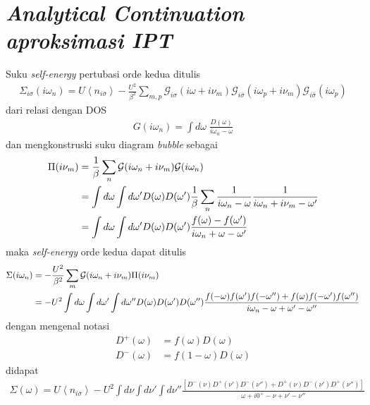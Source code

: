 
\chapter{\textit{Analytical Continuation aproksimasi IPT}}

Suku \textit{self-energy} pertubasi orde kedua ditulis
\begin{align}
\Sigma_{i\sigma}(i\omega_n) = U\left< n_{i\bar{\sigma}} \right> - \frac{U^2}{\beta^2} \sum_{m,p} \mathcal{G}_{i\sigma}(i\omega + i\nu_m)\mathcal{G}_{i\bar{\sigma}}(i\omega_p + i\nu_m)\mathcal{G}_{i\bar{\sigma}}(i\omega_p)
\end{align}
dari relasi dengan DOS
\begin{align}
G(i\omega_n) = \int d\omega \; \frac{D(\omega)}{i\omega_n - \omega}
\end{align}
dan mengkonstruski suku diagram \textit{bubble} sebagai
\begin{align}
\Pi(i\nu_m) &= \frac{1}{\beta} \sum_n \mathcal{G}(i\omega_n + i\nu_m)\mathcal{G}(i\omega_n)\notag\\
&= \int d\omega \int d\omega' D(\omega)D(\omega') \frac{1}{\beta} \sum_n \frac{1}{i\omega_n - \omega}\frac{1}{i\omega_n + i\nu_m - \omega'}\notag\\
&= \int d\omega \int d\omega' D(\omega)D(\omega')\frac{f(\omega) - f(\omega')}{i\omega_n + \omega - \omega'}
\end{align}
maka \textit{self-energy} orde kedua dapat ditulis
\begin{align}
\Sigma(i\omega_n) &= -\frac{U^2}{\beta^2}\sum_m \mathcal{G}(i\omega_n + i\nu_m)\Pi(i\nu_m)\notag\\
&= -U^2 \int d\omega \int d\omega' \int d\omega'' D(\omega)D(\omega')D(\omega'') \frac{f(-\omega)f(\omega')f(-\omega'') + f(\omega)f(-\omega')f(\omega'')}{i\omega_n - \omega + \omega' - \omega''}
\end{align}
dengan mengenal notasi
\begin{align}
D^+(\omega) &= f(\omega)D(\omega)\\
D^-(\omega) &= f(1 - \omega)D(\omega)
\end{align}
didapat
\begin{align}
\Sigma(\omega) = U\left< n_{i\bar{\sigma}} \right> - U^2 \int d\nu \int d\nu' \int d\nu'' \frac{[D^-(\nu)D^+(\nu')D^-(\nu'') + D^+(\nu)D^-(\nu')D^+(\nu'')]}{\omega + i0^+ - \nu + \nu' - \nu''}
\end{align}